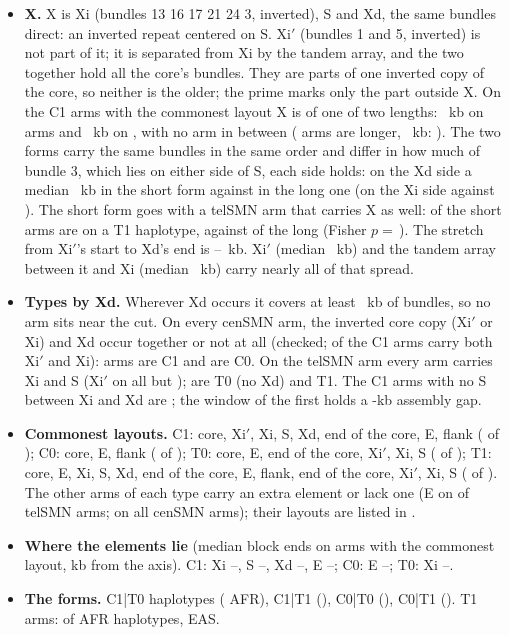 \begin{itemize}
\item \textbf{X.} X is Xi (bundles 13 16 17 21 24 3, inverted), S and Xd, the same bundles direct: an inverted repeat centered on S. Xi$'$ (bundles 1 and 5, inverted) is not part of it; it is separated from Xi by the tandem array, and the two together hold all the core's bundles. They are parts of one inverted copy of the core, so neither is the older; the prime marks only the part outside X. On the \xSpanN{} C1 arms with the commonest layout X is of one of two lengths: \xFormShortKb~kb on \xFormShortN{} arms and \xFormLongKb~kb on \xFormLongN, with no arm in between (\xFormBigN{} arms are longer, \xFormBigKb~kb: \xFormBigHaps). The two forms carry the same bundles in the same order and differ in how much of bundle 3, which lies on either side of S, each side holds: on the Xd side a median \xFormShortBd~kb in the short form against \xFormLongBd{} in the long one (on the Xi side \xFormShortBi{} against \xFormLongBi). The short form goes with a telSMN arm that carries X as well: \xFormShortTOne{} of the \xFormShortN{} short arms are on a T1 haplotype, against \xFormLongTOne{} of the \xFormLongN{} long (Fisher $p=$\,\xFormP). The stretch from Xi$'$'s start to Xd's end is \xFullLo--\xFullHi~kb. Xi$'$ (median \xInMed~kb) and the tandem array between it and Xi (median \xGapMed~kb) carry nearly all of that spread.
\item \textbf{Types by Xd.} Wherever Xd occurs it covers at least \elXdMin~kb of bundles, so no arm sits near the cut.
On every cenSMN arm, the inverted core copy (Xi$'$ or Xi) and Xd occur together or not at all (checked; \xpCOneBoth{} of the C1 arms carry both Xi$'$ and Xi): \elCOne{} arms are C1 and \elCZero{} are C0.
On the telSMN arm every arm carries Xi and S (Xi$'$ on all but \xpTelNoPrime); \elTZero{} are T0 (no Xd) and \elTOne{} T1. The \xcNoS{} C1 arms with no S between Xi and Xd are \xcNoSNames; the window of the first holds a \gapNoSKb-kb assembly gap.
\item \textbf{Commonest layouts.} C1: core, Xi$'$, Xi, S, Xd, end of the core, E, flank (\elCOneCan{} of \elCOne); C0: core, E, flank
(\elCZeroCan{} of \elCZero); T0: core, E, end of the core, Xi$'$, Xi, S (\elTZeroCan{} of \elTZero); T1: core, E, Xi, S, Xd, end of the
core, E, flank, end of the core, Xi$'$, Xi, S (\elTOneCan{} of \elTOne). The other arms of each type carry an extra element or
lack one (E on \elEtel{} of \elHaps{} telSMN arms; on all \elEcen{} cenSMN arms); their layouts are listed in
.
\item \textbf{Where the elements lie} (median block ends on arms with the commonest layout, kb from the axis). C1: Xi
\elCXiLo--\elCXiHi, S \elCSLo--\elCSHi, Xd \elCXdLo--\elCXdHi, E \elCELo--\elCEHi; C0: E \elZELo--\elZEHi; T0: Xi
\elTXiLo--\elTXiHi.
\item \textbf{The forms.} C1|T0 \elFonezero{} haplotypes (\elFonezeroAfr{} AFR), C1|T1 \elFoneone{} (\elFoneoneAfr),
C0|T0 \elFzerozero{} (\elFzerozeroAfr), C0|T1 \elFzeroone{} (\elFzerooneAfr). T1 arms: \elTOneAfr{} of \elAfrHaps{} AFR
haplotypes, \elTOneEas{} EAS.
\end{itemize}

